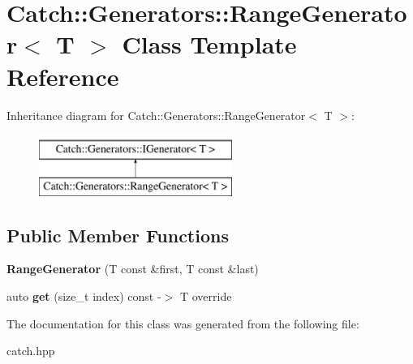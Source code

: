 \hypertarget{class_catch_1_1_generators_1_1_range_generator}{}\section{Catch\+:\+:Generators\+:\+:Range\+Generator$<$ T $>$ Class Template Reference}
\label{class_catch_1_1_generators_1_1_range_generator}
Inheritance diagram for Catch\+:\+:Generators\+:\+:Range\+Generator$<$ T $>$\+:\begin{figure}[H]
\begin{center}
\leavevmode
\includegraphics[height=2.000000cm]{class_catch_1_1_generators_1_1_range_generator}
\end{center}
\end{figure}
\subsection*{Public Member Functions}
\begin{DoxyCompactItemize}
\item 
\mbox{\label{class_catch_1_1_generators_1_1_range_generator_a56c5fcc855bdb668d7b93c2017a7c44c}} 
{\bfseries Range\+Generator} (T const \&first, T const \&last)
\item 
\mbox{\label{class_catch_1_1_generators_1_1_range_generator_a78f7f624b7545823d1a683ebf2ac00e7}} 
auto {\bfseries get} (size\+\_\+t index) const -\/$>$ T override
\end{DoxyCompactItemize}


The documentation for this class was generated from the following file\+:\begin{DoxyCompactItemize}
\item 
catch.\+hpp\end{DoxyCompactItemize}
